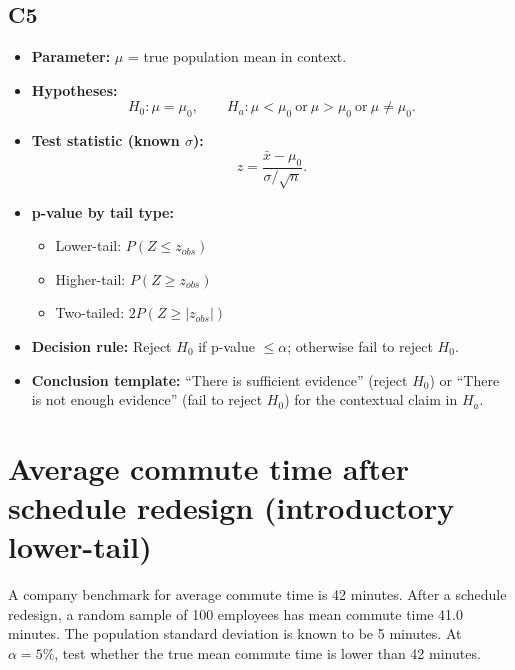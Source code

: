 \subsection*{C5}
\begin{itemize}
    \item \textbf{Parameter:} \(\mu\) = true population mean in context.
    \item \textbf{Hypotheses:}
    \[
    H_0\colon \mu=\mu_0,\qquad
    H_a\colon \mu<\mu_0\ \text{or}\ \mu>\mu_0\ \text{or}\ \mu\ne\mu_0.
    \]
    \item \textbf{Test statistic (known \(\sigma\)):}
    \[
    z=\frac{\bar x-\mu_0}{\sigma/\sqrt{n}}.
    \]
    \item \textbf{p-value by tail type:}
    \begin{itemize}
        \item Lower-tail: \(P(Z\le z_{obs})\)
        \item Higher-tail: \(P(Z\ge z_{obs})\)
        \item Two-tailed: \(2P(Z\ge |z_{obs}|)\)
    \end{itemize}
    \item \textbf{Decision rule:} Reject \(H_0\) if p-value \(\le\alpha\); otherwise fail to reject \(H_0\).
    \item \textbf{Conclusion template:} ``There is sufficient evidence'' (reject \(H_0\)) or ``There is not enough evidence'' (fail to reject \(H_0\)) for the contextual claim in \(H_a\).
\end{itemize}

\begin{center}
\hspace{0.8cm}
\hspace{0.8cm}
\end{center}

\section{Average commute time after schedule redesign (introductory lower-tail)}
A company benchmark for average commute time is 42 minutes. After a schedule redesign, a random sample of 100 employees has mean commute time 41.0 minutes. The population standard deviation is known to be 5 minutes. At \(\alpha=5\%\), test whether the true mean commute time is lower than 42 minutes.

